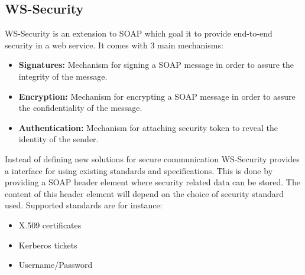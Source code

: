 \subsection{WS-Security}
WS-Security is an extension to SOAP which goal it to provide end-to-end security in a web service. It comes with 3 main mechanisms:
\begin{itemize}
	\item \textbf{Signatures:} Mechanism for signing a SOAP message in order to assure the integrity of the message.
	\item \textbf{Encryption:} Mechanism for encrypting a SOAP message in order to assure the confidentiality of the message.
	\item \textbf{Authentication:} Mechanism for attaching security token to reveal the identity of the sender.
\end{itemize}

Instead of defining new solutions for secure communication WS-Security provides a interface for using existing standards and specifications. This is done by providing a SOAP header element where security related data can be stored. The content of this header element will depend on the choice of security standard used. Supported standards are for instance:
\begin{itemize}
	\item X.509 certificates
	\item Kerberos tickets
	\item Username/Password
\end{itemize}